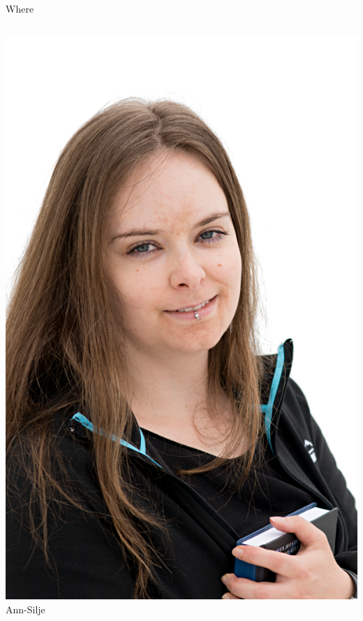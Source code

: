 \documentclass[12pt,table,t]{beamer}
\begin{document}
\begin{frame}{Where}
\begin{columns}[c]
    \begin{center}
      \includegraphics[width=\linewidth]{figure/annsilje} \\
      Ann-Silje
    \end{center}


\end{columns}
\end{frame}
\end{document}
